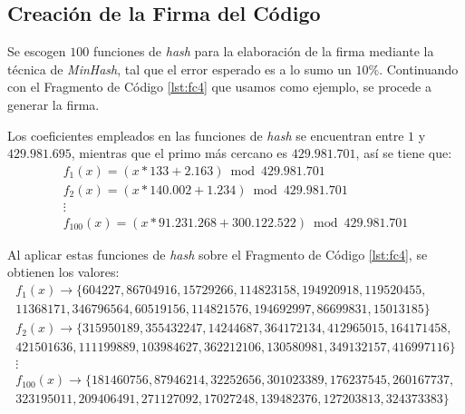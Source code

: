 \subsection{Creación de la Firma del Código}
\label{subsec:DesFirCod}

Se escogen $100$ funciones de \textit{hash} para la elaboración
de la firma mediante la técnica de \textit{MinHash},
tal que el error esperado es a lo sumo un $10\%$.
Continuando con el Fragmento de Código \ref{lst:fc4} que usamos como ejemplo,
se procede a generar la firma.

Los coeficientes empleados en las funciones de \textit{hash} se encuentran entre $1$ y $429.981.695$,
mientras que el primo más cercano es $429.981.701$, así se tiene que:
\begin{gather*}
f_1(x) = (x * 133 + 2.163) \bmod 429.981.701 \\
f_2(x) = (x * 140.002 + 1.234) \bmod 429.981.701\\
\vdots \\
f_{100}(x) = (x * 91.231.268 + 300.122.522) \bmod 429.981.701
\end{gather*}
	





Al aplicar estas funciones de \textit{hash} sobre el Fragmento de Código \ref{lst:fc4}, se obtienen los valores:
\begin{gather*}
f_1(x) \rightarrow \{604227, 86704916, 15729266, 114823158, 194920918, 119520455,\\
							  11368171, 346796564, 60519156, 114821576, 194692997, 86699831, 15013185\}\\
f_2(x) \rightarrow \{315950189, 355432247, 14244687, 364172134, 412965015, 164171458,\\
							  421501636, 111199889, 103984627, 362212106, 130580981, 349132157, 416997116\}\\
\vdots\\
f_{100}(x) \rightarrow \{181460756, 87946214, 32252656, 301023389, 176237545, 260167737,\\
									 323195011, 209406491, 271127092, 17027248, 139482376, 127203813, 324373383\}
\end{gather*}

